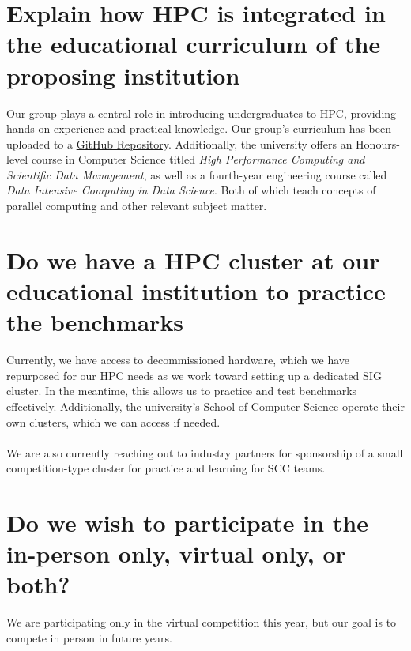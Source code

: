 \documentclass[10pt, onecolumn]{IEEEtran}
\begin{document}
\section{Explain how HPC is integrated in the educational curriculum of the proposing institution}
\noindent
Our group plays a central role in introducing undergraduates to HPC, providing hands-on experience and practical knowledge. Our group's curriculum has been uploaded to a \href{https://github.com/WitsHPC/HPC-InterestGroup}{GitHub Repository}. Additionally, the university offers an Honours-level course in Computer Science titled \textit{High Performance Computing and Scientific Data Management}, as well as a fourth-year engineering course called \textit{Data Intensive Computing in Data Science}. Both of which teach concepts of parallel computing and other relevant subject matter.
\section{Do we have a HPC cluster at our educational institution to practice the benchmarks}
\noindent
Currently, we have access to decommissioned hardware, which we have repurposed for our HPC needs as we work toward setting up a dedicated SIG cluster. In the meantime, this allows us to practice and test benchmarks effectively. Additionally, the university’s School of Computer Science operate their own clusters, which we can access if needed.
\\\\
We are also currently reaching out to industry partners for sponsorship of a small competition-type cluster for practice and learning for SCC teams.
\section{Do we wish to participate in the in-person only, virtual only, or both?}
\noindent
We are participating only in the virtual competition this year, but our goal is to compete in person in future years.
%
%
\label{lastBodyPage}
\newpage
{}
\appendices
\label{lastRomanPage}
\end{document}
